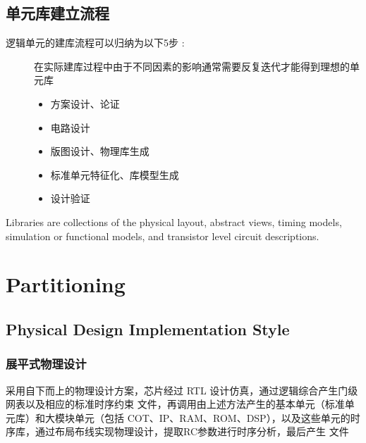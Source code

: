 \documentclass[letterpaper,10pt,english]{sphinxmanual}
\begin{document}
\section{单元库建立流程}
\label{\detokenize{chapter2/_u5355_u5143_u5e93_u5efa_u7acb_u6d41_u7a0b:id1}}\label{\detokenize{chapter2/_u5355_u5143_u5e93_u5efa_u7acb_u6d41_u7a0b::doc}}\begin{description}
\item[{逻辑单元的建库流程可以归纳为以下5步 \sphinxfootnotemark[1] :}] \leavevmode%
\begin{footnotetext}[1]\label{\thesphinxscope.1}%
\sphinxAtStartFootnote
在实际建库过程中由于不同因素的影响通常需要反复迭代才能得到理想的单元库
%
\end{footnotetext}\ignorespaces \begin{itemize}
\item {} 
\sphinxAtStartPar
方案设计、论证

\item {} 
\sphinxAtStartPar
电路设计

\item {} 
\sphinxAtStartPar
版图设计、物理库生成

\item {} 
\sphinxAtStartPar
标准单元特征化、库模型生成

\item {} 
\sphinxAtStartPar
设计验证

\end{itemize}

\end{description}

\sphinxAtStartPar
Libraries are collections of the physical layout, abstract views, timing models, simulation or functional models, and transistor level circuit descriptions.


\chapter{Partitioning}
\label{\detokenize{chapter3/index:partitioning}}\label{\detokenize{chapter3/index::doc}}

\section{Physical Design Implementation Style}
\label{\detokenize{chapter3/index:physical-design-implementation-style}}

\subsection{展平式物理设计}
\label{\detokenize{chapter3/index:id1}}
\sphinxAtStartPar
采用自下而上的物理设计方案，芯片经过 RTL 设计仿真，通过逻辑综合产生门级网表以及相应的标准时序约束   文件，再调用由上述方法产生的基本单元（标准单元库）和大模块单元（包括 COT、IP、RAM、ROM、DSP），以及这些单元的时序库，通过布局布线实现物理设计，提取RC参数进行时序分析，最后产生  文件
\end{document}
